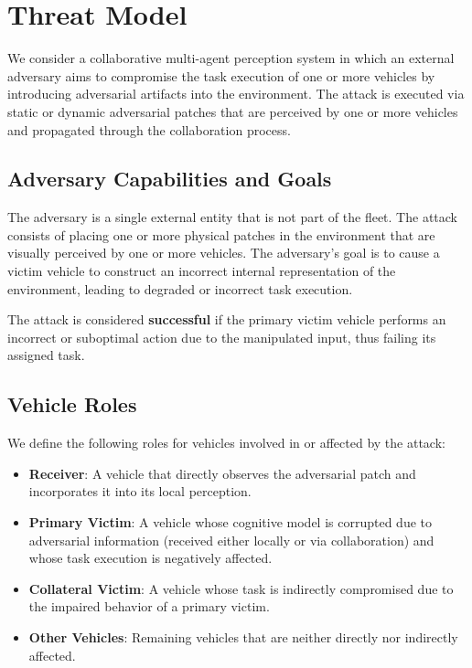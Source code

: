 \section{Threat Model}

We consider a collaborative multi-agent perception system in which an external adversary aims to compromise the task execution of one or more vehicles by introducing adversarial artifacts into the environment. The attack is executed via static or dynamic adversarial patches that are perceived by one or more vehicles and propagated through the collaboration process.

\subsection{Adversary Capabilities and Goals}

The adversary is a single external entity that is not part of the fleet. The attack consists of placing one or more physical patches in the environment that are visually perceived by one or more vehicles. The adversary's goal is to cause a victim vehicle to construct an incorrect internal representation of the environment, leading to degraded or incorrect task execution.

The attack is considered \textbf{successful} if the primary victim vehicle performs an incorrect or suboptimal action due to the manipulated input, thus failing its assigned task.

\subsection{Vehicle Roles}

We define the following roles for vehicles involved in or affected by the attack:

\begin{itemize}
    \item \textbf{Receiver}: A vehicle that directly observes the adversarial patch and incorporates it into its local perception.
    \item \textbf{Primary Victim}: A vehicle whose cognitive model is corrupted due to adversarial information (received either locally or via collaboration) and whose task execution is negatively affected.
    \item \textbf{Collateral Victim}: A vehicle whose task is indirectly compromised due to the impaired behavior of a primary victim.
    \item \textbf{Other Vehicles}: Remaining vehicles that are neither directly nor indirectly affected.
\end{itemize}

